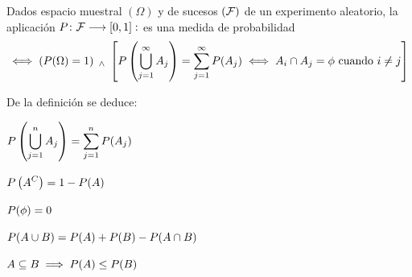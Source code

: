 \begin{defn} 
	Dados espacio muestral $(\Omega)$ y de sucesos $(\mathcal{F})$ de un experimento aleatorio, la aplicación $P \colon \mathcal{F} \longrightarrow [0, 1] : $ es una medida de probabilidad
	\[ \iff \left(P(\Omega) = 1\right) \; _{\wedge} \; \left[P\left(\bigcup_{j=1}^{\infty} A_j\right) = \sum_{j=1}^{\infty} P(A_j) \iff A_i\cap A_j = \phi \text{ cuando } i \ne j\right] \]
\end{defn}
\begin{prop}
	De la definición se deduce: \\
	\begin{enumerate*}[itemjoin=\hspace{1cm}]
		\item $\displaystyle P\left(\bigcup_{j=1}^n A_j\right) = \sum_{j=1}^{n} P(A_j)$
		\item $\displaystyle P\left(A^C\right) = 1-P(A)$
		\item $\displaystyle P(\phi) = 0$ \\
		\item $\displaystyle P(A\cup B) = P(A) + P(B) - P(A\cap B)$
		\item $\displaystyle A \subseteq B \implies P(A) \leq P(B)$
	\end{enumerate*}
\end{prop}


